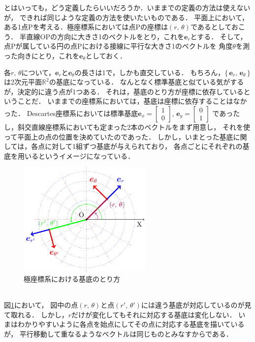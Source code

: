 とはいっても，どう定義したらいいだろうか．いままでの定義の方法は使えないが，
できれば同じような定義の方法を使いたいものである．
平面上において，ある1点Pを考える．極座標系においては点Pの座標は$(r, \, \theta)$であるとしておこう．
半直線OPの方向に大きさ1のベクトルをとり，これを$\bm{e}_r$とする．
そして，点Pが属している円の点Pにおける接線に平行な大きさ1のベクトルを
角度$\theta$を測った向きにとり，これを$\bm{e}_\theta$としておく．

各$r, \, \theta$について，$\bm{e}_r$と$\bm{e}_\theta$の長さは1で，しかも直交している．
もちろん，$ \{ \, \bm{e}_r, \, \bm{e}_\theta \, \} $は2次元平面$\mathbb{R}^2$の基底になっている． 
なんとなく標準基底と似ている気がするが，決定的に違う点が1つある．
それは，基底のとり方が座標に依存しているということだ．
いままでの座標系においては，基底は座標に依存することはなかった．
Descartes座標系においては標準基底$\bm{e}_x = 
\left[
\begin{array}{c}
1 \\
0
\end{array}
\right]
, \, 
\bm{e}_y =
\left[
\begin{array}{c}
0 \\
1
\end{array}
\right]$
であったし，斜交直線座標系においても定まった2本のベクトルをまず用意し，
それを使って平面上の点の位置を決めていたのであった．
しかし，いまとった基底に関しては，各点に対して1組ずつ基底が与えられており，
各点ごとにそれぞれの基底を用いるというイメージになっている．
\begin{figure}[h]
 \begin{center}
 \includegraphics[width=6.5cm]{picture/vecter13.pdf}
 \caption{極座標系における基底のとり方}
\label{fig:kyokukitei}
 \end{center}
\end{figure}
\\
図\ref{fig:kyokukitei}において，
図中の点$(r, \, \theta)$と点$(r', \, \theta')$には違う基底が対応しているのが見て取れる．
しかし，$r$だけが変化してもそれに対応する基底は変化しない．
いまはわかりやすいように各点を始点にしてその点に対応する基底を描いているが，
平行移動して重なるようなベクトルは同じものとみなすからである．

